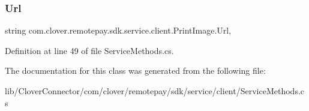 \subsubsection{\texorpdfstring{Url}{Url}}
{\footnotesize\ttfamily string com.\+clover.\+remotepay.\+sdk.\+service.\+client.\+Print\+Image.\+Url\hspace{0.3cm}{\ttfamily [get]}, {\ttfamily [set]}}



Definition at line 49 of file Service\+Methods.\+cs.



The documentation for this class was generated from the following file\+:\begin{DoxyCompactItemize}
\item 
lib/\+Clover\+Connector/com/clover/remotepay/sdk/service/client/Service\+Methods.\+cs\end{DoxyCompactItemize}
